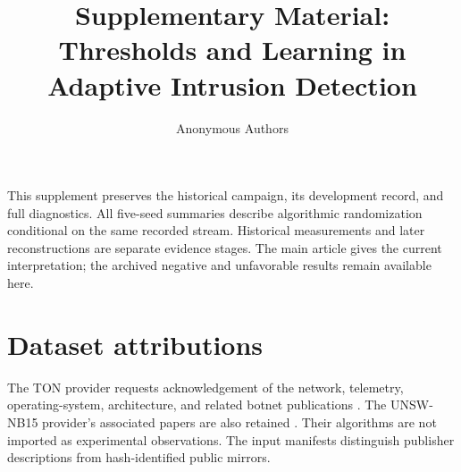 
\renewcommand{\thesection}{S\arabic{section}}
\renewcommand{\thetable}{S\arabic{table}}
\renewcommand{\thefigure}{S\arabic{figure}}
\title{Supplementary Material: Thresholds and Learning in Adaptive Intrusion Detection}
\ifdefined\AuthorVersion\else\author{Anonymous Authors}\fi


\maketitle
\ifdefined\AuthorVersion\setauthorpdfmetadata\fi
This supplement preserves the historical campaign, its development record, and full diagnostics. All five-seed summaries describe algorithmic randomization conditional on the same recorded stream. Historical measurements and later reconstructions are separate evidence stages. The main article gives the current interpretation; the archived negative and unfavorable results remain available here.

\FloatBarrier

\FloatBarrier

\FloatBarrier

\FloatBarrier

\FloatBarrier


\FloatBarrier
\section{Dataset attributions}
The TON provider requests acknowledgement of the network, telemetry, operating-system, architecture, and related botnet publications \citep{moustafa2021,booij2022,alsaedi2020,moustafa2020windows,moustafa2020linux,moustafa2019dataset,moustafa2019fog,ashraf2021}. The UNSW-NB15 provider's associated papers are also retained \citep{moustafa2015unsw,moustafa2016unsw,moustafa2019geometry,moustafa2017dirichlet,sarhan2021}. Their algorithms are not imported as experimental observations. The input manifests distinguish publisher descriptions from hash-identified public mirrors.


